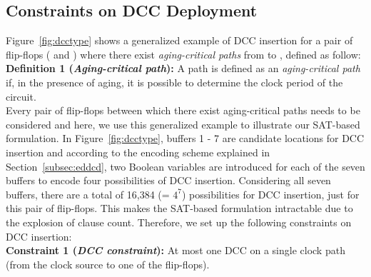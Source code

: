 \subsection{Constraints on DCC Deployment}
\label{subsec:dccccc}
Figure~\ref{fig:dcctype} shows a generalized example of DCC insertion for a pair of flip-flops ( and ) where there exist \textit{aging-critical paths} from  to , defined as follow:\\

\noindent \textbf{Definition 1 (\textit{Aging-critical path}):}  A path is defined as an \textit{aging-critical path} if, in the presence of aging, it is possible to determine the clock period of the circuit.\\ 

Every pair of flip-flops between which there exist aging-critical paths needs to be considered and here, we use this generalized example to illustrate our SAT-based formulation. In Figure~\ref{fig:dcctype}, buffers 1 - 7 are candidate locations for DCC insertion and according to the encoding scheme explained in Section~\ref{subsec:eddcd}, two Boolean variables are introduced for each of the seven buffers to encode four possibilities of DCC insertion. Considering all seven buffers, there are a total of 16,384 (= $4^7$) possibilities for DCC insertion, just for this pair of flip-flops. This makes the SAT-based formulation intractable due to the explosion of clause count. Therefore, we set up the following constraints on DCC insertion: \\

\noindent \textbf{Constraint 1 (\textit{DCC constraint}):} At most one DCC on a single clock path (from the clock source to one of the flip-flops).\\

